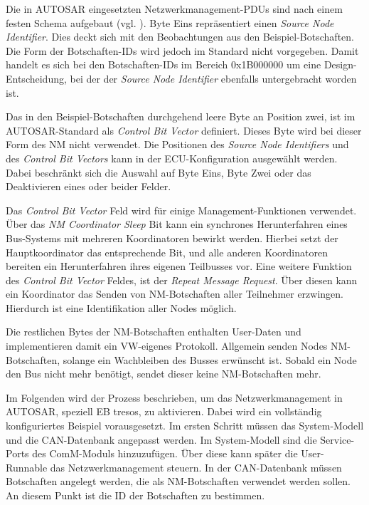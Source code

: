 \documentclass[
  a4paper,					    %
  twoside,
  DIV=calc,     				%
  bibliography=totoc,
  cleardoublepage=empty,
  ngerman,     					%
  final       					%
]{scrbook}
\begin{document}
Die in AUTOSAR eingesetzten Netzwerkmanagement-PDUs sind nach einem festen Schema aufgebaut (vgl. \cite[Seite 51]{autosar_cannm}). Byte Eins repräsentiert einen \emph{Source Node Identifier}. Dies deckt sich mit den Beobachtungen aus den Beispiel-Botschaften. Die Form der Botschaften-IDs wird jedoch im Standard nicht vorgegeben. Damit handelt es sich bei den Botschaften-IDs im Bereich 0x1B000000 um eine Design-Entscheidung, bei der der \emph{Source Node Identifier} ebenfalls untergebracht worden ist.

Das in den Beispiel-Botschaften durchgehend leere Byte an Position zwei, ist im AUTOSAR-Standard als \emph{Control Bit Vector} definiert. Dieses Byte wird bei dieser Form des NM nicht verwendet. Die Positionen des \emph{Source Node Identifiers} und des \emph{Control Bit Vectors} kann in der ECU-Konfiguration ausgewählt werden. Dabei beschränkt sich die Auswahl auf Byte Eins, Byte Zwei oder das Deaktivieren eines oder beider Felder.

Das \emph{Control Bit Vector} Feld wird für einige Management-Funktionen verwendet. Über das \emph{NM Coordinator Sleep} Bit kann ein synchrones Herunterfahren eines Bus-Systems mit mehreren Koordinatoren bewirkt werden. Hierbei setzt der Hauptkoordinator das entsprechende Bit, und alle anderen Koordinatoren bereiten ein Herunterfahren ihres eigenen Teilbusses vor. Eine weitere Funktion des \emph{Control Bit Vector} Feldes, ist der \emph{Repeat Message Request}. Über diesen kann ein Koordinator das Senden von NM-Botschaften aller Teilnehmer erzwingen. Hierdurch ist eine Identifikation aller Nodes möglich.

Die restlichen Bytes der NM-Botschaften enthalten User-Daten und implementieren damit ein VW-eigenes Protokoll. Allgemein senden Nodes NM-Botschaften, solange ein Wachbleiben des Busses erwünscht ist. Sobald ein Node den Bus nicht mehr benötigt, sendet dieser keine NM-Botschaften mehr.

Im Folgenden wird der Prozess beschrieben, um das Netzwerkmanagement in AUTOSAR, speziell EB tresos, zu aktivieren. Dabei wird ein vollständig konfiguriertes Beispiel vorausgesetzt. Im ersten Schritt müssen das System-Modell und die CAN-Datenbank angepasst werden. Im System-Modell sind die Service-Ports des ComM-Moduls hinzuzufügen. Über diese kann später die User-Runnable das Netzwerkmanagement steuern. In der CAN-Datenbank müssen Botschaften angelegt werden, die als NM-Botschaften verwendet werden sollen. An diesem Punkt ist die ID der Botschaften zu bestimmen.
\end{document}
